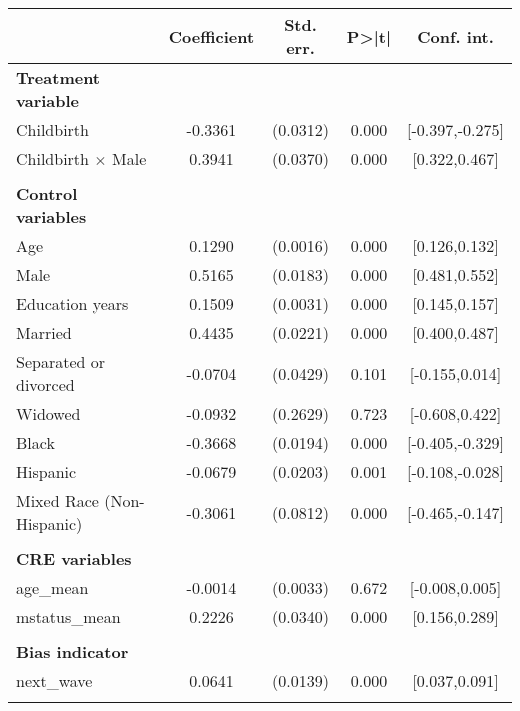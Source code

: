 {
\def\sym#1{\ifmmode^{#1}\else\(^{#1}\)\fi}
\begin{tabular}{l*{1}{cccc}}
\toprule
                    & Coefficient&   Std. err.&       P>|t|&  Conf. int.\\
\midrule
\textbf{Treatment variable}&            &            &            &            \\
Childbirth          &     -0.3361&    (0.0312)&       0.000&[-0.397,-0.275]\\
Childbirth $\times$ Male&      0.3941&    (0.0370)&       0.000&[0.322,0.467]\\
\\ \textbf{Control variables}&            &            &            &            \\
Age                 &      0.1290&    (0.0016)&       0.000&[0.126,0.132]\\
Male                &      0.5165&    (0.0183)&       0.000&[0.481,0.552]\\
Education years     &      0.1509&    (0.0031)&       0.000&[0.145,0.157]\\
Married             &      0.4435&    (0.0221)&       0.000&[0.400,0.487]\\
Separated or divorced&     -0.0704&    (0.0429)&       0.101&[-0.155,0.014]\\
Widowed             &     -0.0932&    (0.2629)&       0.723&[-0.608,0.422]\\
Black               &     -0.3668&    (0.0194)&       0.000&[-0.405,-0.329]\\
Hispanic            &     -0.0679&    (0.0203)&       0.001&[-0.108,-0.028]\\
Mixed Race (Non-Hispanic)&     -0.3061&    (0.0812)&       0.000&[-0.465,-0.147]\\
\\ \textbf{CRE variables}&            &            &            &            \\
age\_mean            &     -0.0014&    (0.0033)&       0.672&[-0.008,0.005]\\
mstatus\_mean        &      0.2226&    (0.0340)&       0.000&[0.156,0.289]\\
\\ \textbf{Bias indicator}&            &            &            &            \\
next\_wave           &      0.0641&    (0.0139)&       0.000&[0.037,0.091]\\
                    &            &            &            &            \\

\end{tabular}}

